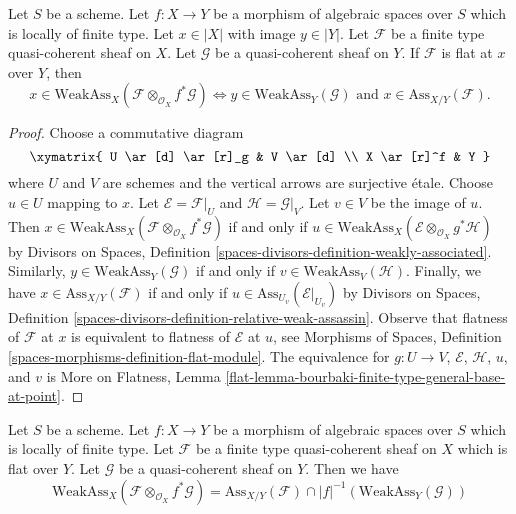 \begin{lemma}
\label{lemma-bourbaki-finite-type-general-base-at-point}
Let $S$ be a scheme.
Let $f : X \to Y$ be a morphism of algebraic spaces over $S$ which is
locally of finite type. Let $x \in |X|$ with image $y \in |Y|$.
Let $\mathcal{F}$ be a finite type quasi-coherent sheaf on $X$.
Let $\mathcal{G}$ be a quasi-coherent sheaf on $Y$.
If $\mathcal{F}$ is flat at $x$ over $Y$, then
$$
x \in \text{WeakAss}_X(\mathcal{F} \otimes_{\mathcal{O}_X} f^*\mathcal{G})
\Leftrightarrow
y \in \text{WeakAss}_Y(\mathcal{G})
\text{ and }
x \in \text{Ass}_{X/Y}(\mathcal{F}).
$$
\end{lemma}

\begin{proof}
Choose a commutative diagram
$$
\xymatrix{
U \ar[d] \ar[r]_g & V \ar[d] \\
X \ar[r]^f & Y
}
$$
where $U$ and $V$ are schemes and the vertical arrows are surjective \'etale.
Choose $u \in U$ mapping to $x$. Let $\mathcal{E} = \mathcal{F}|_U$
and $\mathcal{H} = \mathcal{G}|_V$.
Let $v \in V$ be the image of $u$. Then
$x \in \text{WeakAss}_X(\mathcal{F} \otimes_{\mathcal{O}_X} f^*\mathcal{G})$
if and only if
$u \in \text{WeakAss}_X(\mathcal{E} \otimes_{\mathcal{O}_X} g^*\mathcal{H})$
by Divisors on Spaces, Definition
\ref{spaces-divisors-definition-weakly-associated}.
Similarly, $y \in \text{WeakAss}_Y(\mathcal{G})$ if and only if
$v \in \text{WeakAss}_V(\mathcal{H})$.
Finally, we have $x \in \text{Ass}_{X/Y}(\mathcal{F})$ if and only if
$u \in \text{Ass}_{U_v}(\mathcal{E}|_{U_v})$ by
Divisors on Spaces, Definition
\ref{spaces-divisors-definition-relative-weak-assassin}.
Observe that flatness of $\mathcal{F}$ at $x$ is
equivalent to flatness of $\mathcal{E}$ at $u$, see
Morphisms of Spaces, Definition \ref{spaces-morphisms-definition-flat-module}.
The equivalence for $g : U \to V$, $\mathcal{E}$, $\mathcal{H}$, $u$, and $v$
is More on Flatness, Lemma
\ref{flat-lemma-bourbaki-finite-type-general-base-at-point}.
\end{proof}

\begin{lemma}
\label{lemma-bourbaki-finite-type-general-base}
Let $S$ be a scheme. Let $f : X \to Y$ be a morphism of algebraic spaces
over $S$ which is locally of finite type.
Let $\mathcal{F}$ be a finite type quasi-coherent sheaf on $X$
which is flat over $Y$. Let $\mathcal{G}$ be a quasi-coherent sheaf on $Y$.
Then we have
$$
\text{WeakAss}_X(\mathcal{F} \otimes_{\mathcal{O}_X} f^*\mathcal{G}) =
\text{Ass}_{X/Y}(\mathcal{F}) \cap
|f|^{-1}(\text{WeakAss}_Y(\mathcal{G}))
$$
\end{lemma}

